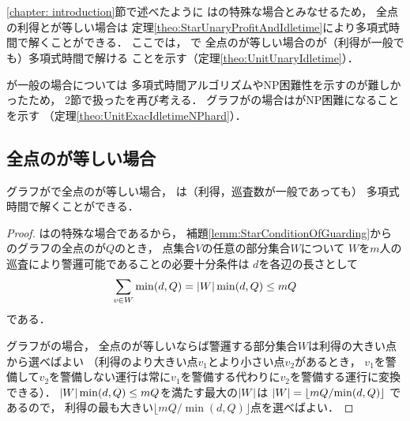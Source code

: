 \chapter{{\graphUnit}}
\label{chapter: unit}

\ref{chapter: introduction}節で述べたように
{\graphUnit}は{\graphStar}の特殊な場合とみなせるため，
全点の利得と{\maxIdletime}が等しい場合{\patProb}は
定理\ref{theo:StarUnaryProfitAndIdletime}により多項式時間で解くことができる．
ここでは，
{\graphUnit}で
全点の{\maxIdletime}が等しい場合の{\patProb}が（利得が一般でも）多項式時間で解ける
ことを示す（定理\ref{theo:UnitUnaryIdletime}）．

{\maxIdletime}が一般の場合については
多項式時間アルゴリズムやNP困難性を示すのが難しかったため，
2節で扱った{\timeSpecifiedPatProb}を再び考える．
グラフが{\graphUnit}の場合は{\timeSpecifiedPatProb}がNP困難になることを示す
（定理\ref{theo:UnitExacIdletimeNPhard}）．



\section{全点の{\maxIdletime}が等しい場合}

\begin{theo}
  \label{theo:UnitUnaryIdletime}
  グラフが{\graphUnit}で全点の{\maxIdletime}が等しい場合，
  {\patProb}は（利得，巡査数が一般であっても）
  多項式時間で解くことができる．
\end{theo}

\begin{proof}
  {\graphUnit}は{\graphStar}の特殊な場合であるから，
  補題\ref{lemm:StarConditionOfGuarding}から
  {\graphUnit}のグラフの全点の{\maxIdletime}が$Q$のとき，
  点集合$V$の任意の部分集合$W$について
  $W$を$m$人の巡査により警邏可能であることの必要十分条件は
  $d$を各辺の長さとして
  \[
    \sum_{v \in W} \min(d, Q) = \lvert{W}\rvert\min(d, Q) \leq mQ
  \]
  である．

  グラフが{\graphUnit}の場合，
  全点の{\maxIdletime}が等しいならば警邏する部分集合$W$は利得の大きい点から選べばよい
  （利得のより大きい点$v_1$とより小さい点$v_2$があるとき，
  $v_1$を警備して$v_2$を警備しない運行は常に$v_1$を警備する代わりに$v_2$を警備する運行に変換できる）．
  $\lvert{W}\rvert\min(d, Q) \leq mQ$を満たす最大の$\lvert{W}\rvert$は
  $\lvert{W}\rvert = \left\lfloor {mQ}/{\min(d, Q)} \right\rfloor$
  であるので，
  利得の最も大きい$\lfloor {mQ}/{\min(d, Q)} \rfloor$点を選べばよい．
\end{proof}




